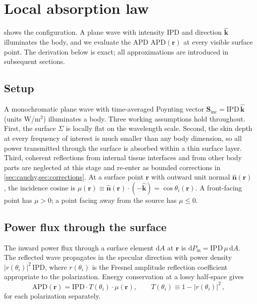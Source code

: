 \documentclass[journal,twocolumn,10pt]{IEEEtran}
\theoremstyle{plain}
\theoremstyle{remark}
\newcommand{\khat}{\hat{\bm{k}}}
\newcommand{\nhat}{\hat{\bm{n}}}
\newcommand{\rr}{\mathbf{r}}
\newcommand{\IPD}{\mathrm{IPD}}
\newcommand{\APD}{\mathrm{APD}}
\newcommand{\diff}{\mathrm{d}}
\begin{document}
\section{Local absorption law}\label{sec:law}

 shows the configuration. A plane wave with
intensity $\IPD$ and direction $\khat$ illuminates the body, and we
evaluate the \gls{APD} $\APD(\rr)$ at every visible
surface point. The derivation below is exact; all approximations are
introduced in subsequent sections.

\subsection{Setup}
A monochromatic plane wave with time-averaged Poynting vector
$\mathbf{S}_{\mathrm{inc}} = \IPD\,\khat$ (units W/m$^2$) illuminates
a body. Three working assumptions hold throughout. First, the
surface $\Sigma$ is locally flat on the wavelength scale. Second, the
skin depth at every frequency of interest is much smaller than any
body dimension, so all power transmitted through the surface is
absorbed within a thin surface layer. Third, coherent reflections
from internal tissue interfaces and from other body parts are
neglected at this stage and re-enter as bounded corrections in
\cref{sec:cauchy,sec:corrections}. At a surface point $\rr$ with
outward unit normal $\nhat(\rr)$, the incidence cosine is
$\mu(\rr) \equiv \nhat(\rr)\cdot(-\khat) = \cos\theta_i(\rr)$. A
front-facing point has $\mu > 0$; a point facing away from the
source has $\mu \le 0$.

\subsection{Power flux through the surface}
The inward power flux through a surface element $\diff A$ at $\rr$
is $\diff P_{\mathrm{in}} = \IPD\,\mu\,\diff A$. The reflected wave
propagates in the specular direction with power density
$|r(\theta_i)|^2\,\IPD$, where $r(\theta_i)$ is the Fresnel amplitude
reflection coefficient appropriate to the polarization. Energy
conservation at a lossy half-space gives
\begin{equation}\label{eq:Sab-pol}
  \APD(\rr) = \IPD \cdot T(\theta_i) \cdot \mu(\rr),
  \qquad T(\theta_i) \equiv 1 - |r(\theta_i)|^2\, ,
\end{equation}
for each polarization separately.
\end{document}

